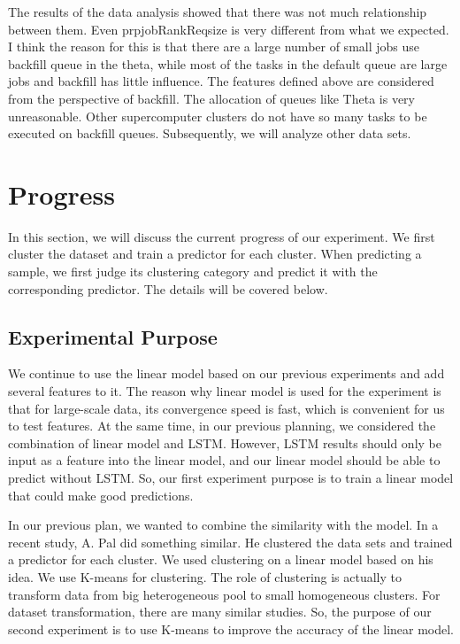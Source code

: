 \documentclass[conference,compsoc]{IEEEtran}
\begin{document}
The results of the data analysis showed that there was not much relationship between them. Even prpjobRankReqsize is very different from what we expected. I think the reason for this is that there are a large number of small jobs use backfill queue in the theta, while most of the tasks in the default queue are large jobs and backfill has little influence. The features defined above are considered from the perspective of backfill. The allocation of queues like Theta is very unreasonable. Other supercomputer clusters do not have so many tasks to be executed on backfill queues. Subsequently, we will analyze other data sets.


\section{Progress}
In this section, we will discuss the current progress of our experiment. We first cluster the dataset and train a predictor for each cluster. When predicting a sample, we first judge its clustering category and predict it with the corresponding predictor. The details will be covered below. 

\subsection{Experimental Purpose}
We continue to use the linear model based on our previous experiments and add several features to it. The reason why linear model is used for the experiment is that for large-scale data, its convergence speed is fast, which is convenient for us to test features. At the same time, in our previous planning, we considered the combination of linear model and LSTM. However, LSTM results should only be input as a feature into the linear model, and our linear model should be able to predict without LSTM. So, our first experiment purpose is to train a linear model that could make good predictions.

In our previous plan, we wanted to combine the similarity with the model. In a recent study, A. Pal\cite{pal2021integrated} did something similar. He clustered the data sets and trained a predictor for each cluster. We used clustering on a linear model based on his idea. We use K-means for clustering. The role of clustering is actually to transform data from big heterogeneous pool to small homogeneous clusters. For dataset transformation, there are many similar  studies\cite{murali2016qespera}\cite{nurmi2007qbets}. So, the purpose of our second experiment is to use K-means to improve the accuracy of the linear model.
\end{document}
